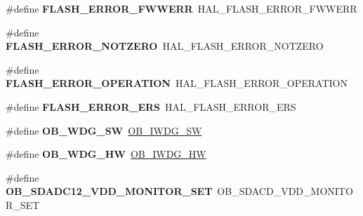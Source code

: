 \begin{DoxyCompactItemize}
\#define {\bfseries F\+L\+A\+S\+H\+\_\+\+E\+R\+R\+O\+R\+\_\+\+F\+W\+W\+E\+RR}~H\+A\+L\+\_\+\+F\+L\+A\+S\+H\+\_\+\+E\+R\+R\+O\+R\+\_\+\+F\+W\+W\+E\+RR
\item 
\mbox{\label{group___h_a_l___f_l_a_s_h___aliased___defines_ga987edd2bf3a39310a655473718d9b495}} 
\#define {\bfseries F\+L\+A\+S\+H\+\_\+\+E\+R\+R\+O\+R\+\_\+\+N\+O\+T\+Z\+E\+RO}~H\+A\+L\+\_\+\+F\+L\+A\+S\+H\+\_\+\+E\+R\+R\+O\+R\+\_\+\+N\+O\+T\+Z\+E\+RO
\item 
\mbox{\label{group___h_a_l___f_l_a_s_h___aliased___defines_gaae29e90680573edfa4e11e07b2557f16}} 
\#define {\bfseries F\+L\+A\+S\+H\+\_\+\+E\+R\+R\+O\+R\+\_\+\+O\+P\+E\+R\+A\+T\+I\+ON}~H\+A\+L\+\_\+\+F\+L\+A\+S\+H\+\_\+\+E\+R\+R\+O\+R\+\_\+\+O\+P\+E\+R\+A\+T\+I\+ON
\item 
\mbox{\label{group___h_a_l___f_l_a_s_h___aliased___defines_gaf908de74b3e013ed30976d9e645354e2}} 
\#define {\bfseries F\+L\+A\+S\+H\+\_\+\+E\+R\+R\+O\+R\+\_\+\+E\+RS}~H\+A\+L\+\_\+\+F\+L\+A\+S\+H\+\_\+\+E\+R\+R\+O\+R\+\_\+\+E\+RS
\item 
\mbox{\label{group___h_a_l___f_l_a_s_h___aliased___defines_gac332a5aa5da146e19f3c39067220f0f8}} 
\#define {\bfseries O\+B\+\_\+\+W\+D\+G\+\_\+\+SW}~\hyperlink{group___f_l_a_s_h_ex___o_b___i_watchdog_ga5a357e232c955444c3f2ccb9a937ffce}{O\+B\+\_\+\+I\+W\+D\+G\+\_\+\+SW}
\item 
\mbox{\label{group___h_a_l___f_l_a_s_h___aliased___defines_gae9a94b5f21aaa5dd5558095fa684b5a3}} 
\#define {\bfseries O\+B\+\_\+\+W\+D\+G\+\_\+\+HW}~\hyperlink{group___f_l_a_s_h_ex___o_b___i_watchdog_gadfcbfa963d79c339ec8e2d5a7734e47a}{O\+B\+\_\+\+I\+W\+D\+G\+\_\+\+HW}
\item 
\mbox{\label{group___h_a_l___f_l_a_s_h___aliased___defines_ga28d03f0c0e87570a3bc2faa4e720b8e3}} 
\#define {\bfseries O\+B\+\_\+\+S\+D\+A\+D\+C12\+\_\+\+V\+D\+D\+\_\+\+M\+O\+N\+I\+T\+O\+R\+\_\+\+S\+ET}~O\+B\+\_\+\+S\+D\+A\+C\+D\+\_\+\+V\+D\+D\+\_\+\+M\+O\+N\+I\+T\+O\+R\+\_\+\+S\+ET
\item 

\end{DoxyCompactItemize}
